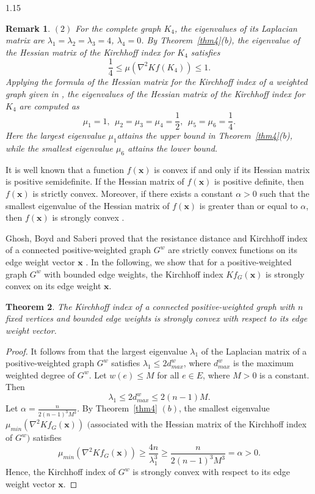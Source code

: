 \documentclass[preprint,12pt]{elsarticle1}
\newtheorem{thm}{Theorem}[section]
\newtheorem{rmk}[thm]{Remark}
\numberwithin{equation}{section}
\begin{document}
\begin{spacing}{1.15}
{\begin{rmk}
$(2)$ For the complete graph $K_{4}$, the eigenvalues of its Laplacian matrix are $\lambda_1=\lambda_2=\lambda_3=4$,
$\lambda_4 =0$. By Theorem~\ref{thm4}(b), the eigenvalue of the Hessian matrix of the Kirchhoff index for $K_{4}$ satisfies $$\frac{1}{4}\leq\mu(\nabla^{2}Kf(K_{4}))\leq 1.$$
Applying the formula of the Hessian matrix for the Kirchhoff index of a  weighted graph given in \cite{ghosh2008minimizing}, the eigenvalues of the Hessian matrix of the Kirchhoff index for  $K_{4}$ are computed as
$$\mu_{1}=1, \ \ \mu_{2}=\mu_{3}=\mu_{4}=\frac{1}{2}, \ \ \mu_{5}=\mu_{6}=\frac{1}{4}.$$ Here the largest eigenvalue $\mu_{1}$attains the upper bound in Theorem~\ref{thm4}(b), while the smallest eigenvalue $\mu_{6}$ attains the lower bound.
\end{rmk}}\fi

It is well known that a function $f(\textbf{x})$ is convex if and only if its Hessian matrix is positive semidefinite. If the Hessian matrix of
$f(\textbf{x})$ is positive definite, then $f(\textbf{x})$ is strictly convex. Moreover, if there exists a constant $\alpha>0$ such that the smallest eigenvalue of the Hessian matrix of  $f(\textbf{x})$ is greater than or equal to $\alpha$, then  $f(\textbf{x})$ is strongly convex \cite{boyd2004convex1}.

Ghosh, Boyd and Saberi proved that the resistance distance and Kirchhoff index of a connected  positive-weighted graph $G^{w}$ are strictly convex functions on its  edge weight vector $\mathbf{x}$ \cite{ghosh2008minimizing}. In the  following, we show that for a  positive-weighted graph $G^{w}$ with bounded edge weights, the Kirchhoff index  $Kf_{G}(\textbf{x})$  is strongly convex on its edge weight $\textbf{x}$.
\begin{thm}
The Kirchhoff index of a connected  positive-weighted graph with $n$ fixed vertices and bounded edge weights is strongly convex with respect to its edge weight vector.
\end{thm}
\begin{proof}
It follows from \cite{anderson1985eigenvalues} that the largest eigenvalue $\lambda_{1}$  of the Laplacian matrix of a  positive-weighted graph $G^{w}$ satisfies
$\lambda_{1}\leq 2 d_{max}^{w}$, where $d_{max}^{w}$ is the maximum weighted degree of $G^{w}$.  Let  $w(e)\leq M$ for all $e\in E$, where $M>0$ is  a constant.  Then $$\lambda_{1}\leq 2d_{max}^{w}\leq 2(n-1)M.$$
Let $\alpha=\frac{n}{2(n-1)^{3}M^{3}}.$ By Theorem~\ref{thm4} $(b)$, the smallest eigenvalue $\mu_{min}(\nabla^{2}Kf_{G}(\textbf{x}))$ $($associated with the Hessian matrix of the Kirchhoff index of $G^{w}$$)$ satisfies
$$\mu_{min}(\nabla^{2}Kf_{G}(\textbf{x}))\geq \frac{4n}{\lambda_{1}^{3}}\geq \frac{n}{2(n-1)^{3}M^{3}}=\alpha
>0.$$  Hence, the Kirchhoff index of $G^{w}$  is strongly convex with respect to its edge weight vector $\textbf{x}$.
\end{proof}

\end{spacing}
\end{document}
